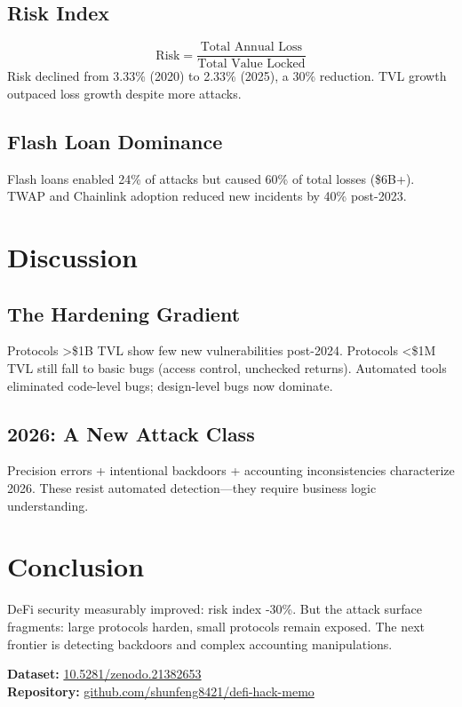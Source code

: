 \documentclass[11pt,a4paper]{article}
\begin{document}
\subsection{Risk Index}
\[
\text{Risk} = \frac{\text{Total Annual Loss}}{\text{Total Value Locked}}
\]
Risk declined from 3.33\% (2020) to 2.33\% (2025), a 30\% reduction. TVL growth outpaced loss growth despite more attacks.

\subsection{Flash Loan Dominance}
Flash loans enabled 24\% of attacks but caused 60\% of total losses (\$6B+). TWAP and Chainlink adoption reduced new incidents by 40\% post-2023.

\section{Discussion}

\subsection{The Hardening Gradient}
Protocols >\$1B TVL show few new vulnerabilities post-2024. Protocols <\$1M TVL still fall to basic bugs (access control, unchecked returns). Automated tools eliminated code-level bugs; design-level bugs now dominate.

\subsection{2026: A New Attack Class}
Precision errors + intentional backdoors + accounting inconsistencies characterize 2026. These resist automated detection—they require business logic understanding.

\section{Conclusion}
DeFi security measurably improved: risk index -30\%. But the attack surface fragments: large protocols harden, small protocols remain exposed. The next frontier is detecting backdoors and complex accounting manipulations.

\vspace{1em}
\noindent\textbf{Dataset:} \url{10.5281/zenodo.21382653}\\
\textbf{Repository:} \url{github.com/shunfeng8421/defi-hack-memo}
\end{document}
